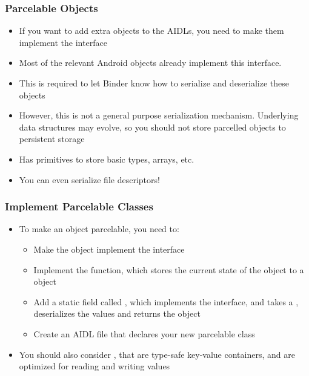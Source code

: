\begin{frame}
  \frametitle{Parcelable Objects}
  \begin{itemize}
  \item If you want to add extra objects to the AIDLs, you need to
    make them implement the  interface
  \item Most of the relevant Android objects already implement this interface.
  \item This is required to let Binder know how to serialize and
    deserialize these objects
  \item However, this is not a general purpose serialization
    mechanism. Underlying data structures may evolve, so you should
    not store parcelled objects to persistent storage
  \item Has primitives to store basic types, arrays, etc.
  \item You can even serialize file descriptors!
  \end{itemize}
\end{frame}

\begin{frame}[fragile]
  \frametitle{Implement Parcelable Classes}
  \begin{itemize}
  \item To make an object parcelable, you need to:
    \begin{itemize}
    \item Make the object implement the  interface
    \item Implement the  function, which stores
      the current state of the object to a  object
    \item Add a static field called , which implements
      the  interface, and takes a
      , deserializes the values and returns the object
    \item Create an AIDL file that declares your new parcelable class
    \end{itemize}
  \item You should also consider , that are type-safe
    key-value containers, and are optimized for reading and writing
    values
  \end{itemize}
\end{frame}

